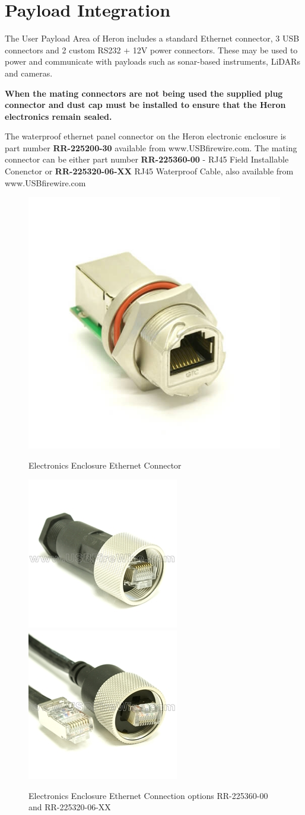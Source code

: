 \documentclass[]{clearpath-latex/clearpath-manual}
\begin{document}
\newpage

\section{Payload Integration}
The User Payload Area of Heron includes a standard Ethernet connector, 3 USB connectors and 2 custom RS232 + 12V power connectors. These may be used to power and communicate with payloads such as sonar-based instruments, LiDARs and cameras.

\textbf{When the mating connectors are not being used the supplied plug connector and dust cap must be installed to ensure that the Heron electronics remain sealed.}

The waterproof ethernet panel connector on the Heron electronic enclosure is part number \textbf{RR-225200-30} available from www.USBfirewire.com. The mating connector can be either part number \textbf{RR-225360-00} - RJ45 Field Installable Conenctor or \textbf{RR-225320-06-XX} RJ45 Waterproof Cable, also available from www.USBfirewire.com



\begin{figure}[h]
  \centering
  \includegraphics[width=0.25\linewidth]{graphics/RR-225200-30.jpg}
  \label{h_eth0}
  \caption{Electronics Enclosure Ethernet Connector}
\end{figure}

\begin{figure}[h]
  \centering
  \includegraphics[width=0.25\linewidth]{graphics/RR-225360-00.jpg}
  \includegraphics[width=0.25\linewidth]{graphics/RR-225320-06-118.jpg}
  
  \label{h_eth1}
  \caption{Electronics Enclosure Ethernet Connection options RR-225360-00 and RR-225320-06-XX}
\end{figure}
\end{document}

